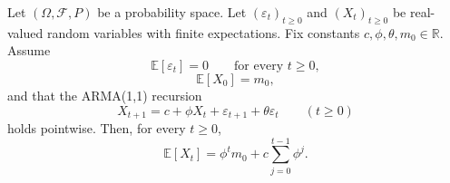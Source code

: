 \begin{theorem}
Let $(\Omega,\mathcal F,P)$ be a probability space. Let
$(\varepsilon_t)_{t\ge 0}$ and $(X_t)_{t\ge 0}$ be real-valued random
variables with finite expectations. Fix constants
$c,\phi,\theta,m_0\in\mathbb R$. Assume
\[
\mathbb E[\varepsilon_t]=0 \qquad \text{for every } t\ge 0,
\]
\[
\mathbb E[X_0]=m_0,
\]
and that the ARMA(1,1) recursion
\[
X_{t+1}=c+\phi X_t+\varepsilon_{t+1}+\theta\varepsilon_t
\qquad (t\ge 0)
\]
holds pointwise. Then, for every $t\ge 0$,
\[
\mathbb E[X_t]
=
\phi^t m_0
+ c\sum_{j=0}^{t-1}\phi^j .
\]
\end{theorem}

